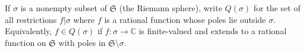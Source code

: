If $\sigma$ is a nonempty subset of $\mathfrak{S}$ (the Riemann sphere), write $Q(\sigma)$ for the set of all restrictions $f|\sigma$ where $f$ is a rational function whose poles lie outside $\sigma$. Equivalently, $f \in Q(\sigma)$ if $f: \sigma \to \mathbb{C}$ is finite-valued and extends to a rational function on $\mathfrak{S}$ with poles in $\mathfrak{S} \setminus \sigma$.

